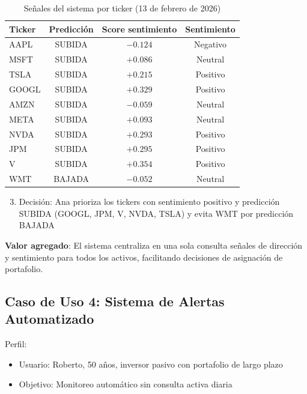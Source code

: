   \begin{table}[H]
  \centering
  \caption{Señales del sistema por ticker (13 de febrero de 2026)}
  \label{tab:portafolio}
  \small
  \begin{tabular}{lccc}
  \toprule
  \textbf{Ticker} & \textbf{Predicción} & \textbf{Score sentimiento} & \textbf{Sentimiento} \\  \midrule
  AAPL  & SUBIDA & $-0.124$ & Negativo \\
  MSFT  & SUBIDA & $+0.086$ & Neutral  \\
  TSLA  & SUBIDA & $+0.215$ & Positivo \\
  GOOGL & SUBIDA & $+0.329$ & Positivo \\
  AMZN  & SUBIDA & $-0.059$ & Neutral  \\
  META  & SUBIDA & $+0.093$ & Neutral  \\
  NVDA  & SUBIDA & $+0.293$ & Positivo \\
  JPM   & SUBIDA & $+0.295$ & Positivo \\
  V     & SUBIDA & $+0.354$ & Positivo \\
  WMT   & BAJADA & $-0.052$ & Neutral  \\
  \bottomrule
  \end{tabular}
  \end{table}

  \begin{enumerate}
      \setcounter{enumi}{2}
      \item Decisión: Ana prioriza los tickers con sentimiento positivo y predicción SUBIDA   
  (GOOGL, JPM, V, NVDA, TSLA) y evita WMT por predicción BAJADA
  \end{enumerate}

  \textbf{Valor agregado}: El sistema centraliza en una sola consulta señales de dirección y  
  sentimiento para todos los activos, facilitando decisiones de asignación de portafolio.     

  \subsection{Caso de Uso 4: Sistema de Alertas Automatizado}

  Perfil:
  \begin{itemize}
      \item Usuario: Roberto, 50 años, inversor pasivo con portafolio de largo plazo
      \item Objetivo: Monitoreo automático sin consulta activa diaria
  \end{itemize}

